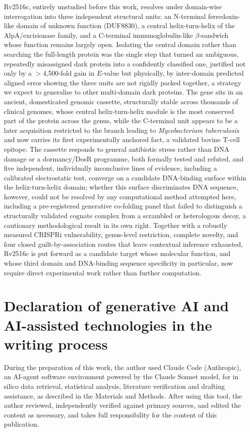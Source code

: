 \documentclass[11pt,a4paper]{article}
\newcommand{\mtb}{\textit{Mycobacterium tuberculosis}}
\begin{document}
Rv2516c, entirely unstudied before this work, resolves under domain-wise interrogation into three
independent structural units: an N-terminal ferredoxin-like domain of unknown function (DUF8830), a
central helix-turn-helix of the AlpA/excisionase family, and a C-terminal immunoglobulin-like
$\beta$-sandwich whose function remains largely open. Isolating the central domain rather than
searching the full-length protein was the single step that turned an ambiguous, repeatedly
misassigned dark protein into a confidently classified one, justified not only by a $>$4{,}500-fold
gain in $E$-value but physically, by inter-domain predicted aligned error showing the three units are
not rigidly packed together, a strategy we expect to generalise to
other multi-domain dark proteins. The gene sits in an ancient, domesticated genomic cassette,
structurally stable across thousands of clinical genomes, whose central helix-turn-helix module is
the most conserved part of the protein across the genus, while the C-terminal unit appears to be a
later acquisition restricted to the branch leading to \mtb{} and now carries its first experimentally
anchored fact, a validated bovine T-cell epitope. The cassette responds to general antibiotic
stress rather than DNA damage or a dormancy/DosR programme, both formally tested and refuted, and
five independent, individually inconclusive lines of evidence, including a calibrated
electrostatic test, converge on a candidate DNA-binding surface within the helix-turn-helix domain;
whether this surface discriminates DNA sequence, however, could not be resolved by any computational
method attempted here, including a pre-registered generative co-folding panel that failed to
distinguish a structurally validated cognate complex from a scrambled or heterologous decoy, a
cautionary methodological result in its own right. Together with a
robustly measured CRISPRi vulnerability, genus-level restriction, complete novelty, and four closed
guilt-by-association routes that leave contextual inference exhausted, Rv2516c is
put forward as a candidate target whose molecular function, and whose third domain and DNA-binding
sequence specificity in particular, now require direct experimental work rather than further
computation.

\section*{Declaration of generative AI and AI-assisted technologies in the writing process}

During the preparation of this work, the author used Claude Code (Anthropic), an AI-agent software
environment powered by the Claude Sonnet model, for in silico data retrieval, statistical analysis,
literature verification and drafting assistance, as described in the Materials and Methods. After
using this tool, the author reviewed, independently verified against primary sources, and edited
the content as necessary, and takes full responsibility for the content of this publication.
\end{document}
